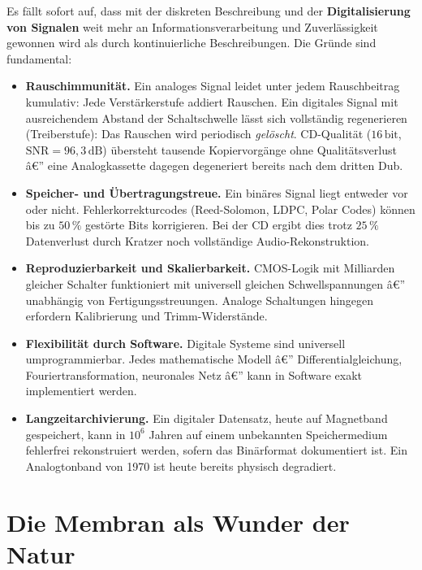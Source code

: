 ﻿\documentclass[12pt,a4paper,titlepage]{report}
\begin{document}
Es fällt sofort auf, dass mit der diskreten Beschreibung und der
\textbf{Digitalisierung von Signalen} weit mehr an Informationsverarbeitung
und Zuverlässigkeit gewonnen wird als durch kontinuierliche Beschreibungen.
Die Gründe sind fundamental:

\begin{itemize}[leftmargin=2em]
	\item \textbf{Rauschimmunität.}
		Ein analoges Signal leidet unter jedem Rauschbeitrag kumulativ:
		Jede Verstärkerstufe addiert Rauschen.
		Ein digitales Signal mit ausreichendem Abstand der Schaltschwelle
		lässt sich vollständig regenerieren (Treiberstufe):
		Das Rauschen wird periodisch \emph{gelöscht}.
		CD-Qualität ($16\,\mathrm{bit}$, $\mathrm{SNR}=96{,}3\,\mathrm{dB}$)
		übersteht tausende Kopiervorgänge ohne Qualitätsverlust â€”
		eine Analogkassette dagegen degeneriert bereits nach dem dritten Dub.
	\item \textbf{Speicher- und Übertragungstreue.}
		Ein binäres Signal liegt entweder vor oder nicht.
		Fehlerkorrekturcodes (Reed-Solomon, LDPC, Polar Codes)
		können bis zu $50\,\%$ gestörte Bits korrigieren.
		Bei der CD ergibt dies trotz $25\,\%$ Datenverlust durch
		Kratzer noch vollständige Audio-Rekonstruktion.
	\item \textbf{Reproduzierbarkeit und Skalierbarkeit.}
		CMOS-Logik mit Milliarden gleicher Schalter funktioniert mit
		universell gleichen Schwellspannungen â€” unabhängig von
		Fertigungsstreuungen.
		Analoge Schaltungen hingegen erfordern Kalibrierung
		und Trimm-Widerstände.
	\item \textbf{Flexibilität durch Software.}
		Digitale Systeme sind universell umprogrammierbar.
		Jedes mathematische Modell â€” Differential\-gleichung,
		Fouriertransformation, neuronales Netz â€” kann in Software
		exakt implementiert werden.
	\item \textbf{Langzeitarchivierung.}
		Ein digitaler Datensatz, heute auf Magnetband gespeichert,
		kann in $10^6$ Jahren auf einem unbekannten Speichermedium
		fehlerfrei rekonstruiert werden, sofern das Binärformat
		dokumentiert ist.
		Ein Analogtonband von 1970 ist heute bereits physisch degradiert.
\end{itemize}

\section{Die Membran als Wunder der Natur}
\end{document}

